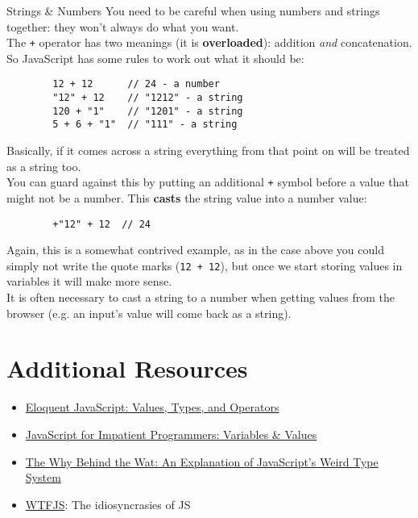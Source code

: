 \begin{infobox}{Strings \& Numbers}
    You need to be careful when using numbers and strings together: they won't always do what you want.
    \\

    The \texttt{+} operator has two meanings (it is \textbf{overloaded}): addition \textit{and} concatenation. So JavaScript has some rules to work out what it should be:

    \begin{verbatim}
        12 + 12      // 24 - a number
        "12" + 12    // "1212" - a string
        120 + "1"    // "1201" - a string
        5 + 6 + "1"  // "111" - a string
    \end{verbatim}

    Basically, if it comes across a string everything from that point on will be treated as a string too.
    \\

    You can guard against this by putting an additional \texttt{+} symbol before a value that might not be a number. This \textbf{casts} the string value into a number value:

    \begin{verbatim}
        +"12" + 12  // 24
    \end{verbatim}

    Again, this is a somewhat contrived example, as in the case above you could simply not write the quote marks (\texttt{12 + 12}), but once we start storing values in variables it will make more sense.
    \\

    It is often necessary to cast a string to a number when getting values from the browser (e.g. an input's value will come back as a string).

\end{infobox}


\section{Additional Resources}

\begin{itemize}[leftmargin=*]
    \item \href{https://eloquentjavascript.net/01_values.html}{Eloquent JavaScript: Values, Types, and Operators}
    \item \href{http://exploringjs.com/impatient-js/ch_variables-assignment.html}{JavaScript for Impatient Programmers: Variables \& Values}
    \item \href{https://medium.com/dailyjs/the-why-behind-the-wat-an-explanation-of-javascripts-weird-type-system-83b92879a8db}{The Why Behind the Wat: An Explanation of JavaScript's Weird Type System}
    \item \href{https://github.com/denysdovhan/wtfjs}{WTFJS}: The idiosyncrasies of JS
\end{itemize}
